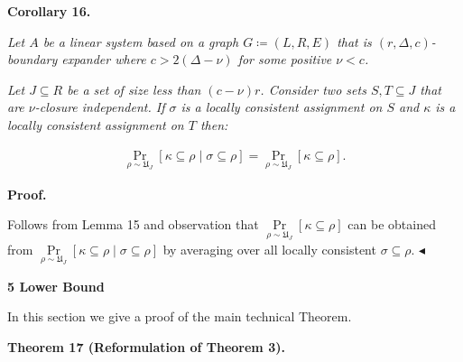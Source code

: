 

\par\medskip\noindent\textbf{
\textbf{Corollary 16}\textbf{.}
}\par



\emph{Let $A$ be a linear system based on a graph $G\coloneqq(L,R,E)$ that is $(r,\Delta,c)$-boundary expander where $c>2(\Delta-\nu)$ for some positive $\nu<c$.}\par




\emph{Let $J\subseteq R$ be a set of size less than $(c-\nu)r$. Consider two sets $S,T\subseteq J$ that
are $\nu$-closure independent. If $\sigma$ is a locally consistent assignment on $S$ and
$\kappa$ is a locally consistent assignment on $T$ then:}\par


\[\begin{gathered}
\Pr\limits_{\rho\sim\mathfrak{U}_{J}}[\kappa\subseteq\rho\mid\sigma\subseteq%
\rho]=\Pr\limits_{\rho\sim\mathfrak{U}_{J}}[\kappa\subseteq\rho].
\end{gathered}\]







\par\medskip\noindent\textbf{Proof.}\par




Follows from Lemma 15 and observation that
$\Pr\limits_{\rho\sim\mathfrak{U}_{J}}[\kappa\subseteq\rho]$ can be obtained from
$\Pr\limits_{\rho\sim\mathfrak{U}_{J}}[\kappa\subseteq\rho\mid\sigma\subseteq\rho]$ by
averaging over all locally consistent $\sigma\subseteq\rho$.
$\blacktriangleleft$\par







\par\medskip\noindent\textbf{
5 Lower Bound}\par




In this section we give a proof of the main technical Theorem.\par





\par\medskip\noindent\textbf{
\textbf{Theorem 17}\textbf{ }(Reformulation of Theorem 3)\textbf{.}
}\par




